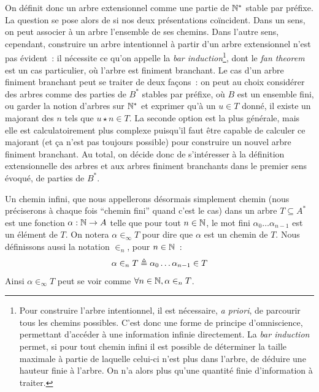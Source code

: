 \documentclass{article}
\begin{document}
On définit donc un arbre extensionnel comme une partie de $\mathbb{N}^*$ stable par préfixe. La question se pose alors de si nos deux présentations coïncident. Dans un sens, on peut associer à un arbre l'ensemble de ses chemins. Dans l'autre sens, cependant, construire un arbre intentionnel à partir d'un arbre extensionnel n'est pas évident~: il nécessite ce qu'on appelle la \textit{bar induction}\footnote{Pour construire l'arbre intentionnel, il est nécessaire, \textit{a priori}, de parcourir tous les chemins possibles. C'est donc une forme de principe d'omniscience, permettant d'accéder à une information infinie directement. La \textit{bar induction} permet, si pour tout chemin infini il est possible de déterminer la taille maximale à partie de laquelle celui-ci n'est plus dans l'arbre, de déduire une hauteur finie à l'arbre. On n'a alors plus qu'une quantité finie d'information à traiter.}, dont le \textit{fan theorem} est un cas particulier, où l'arbre est finiment branchant. Le cas d'un arbre finiment branchant peut se traiter de deux façons~: on peut au choix considérer des arbres comme des parties de $B^*$ stables par préfixe, où $B$ est un ensemble fini, ou garder la notion d'arbres sur $\mathbb{N}^*$ et exprimer qu'à un $u \in T$ donné, il existe un majorant des $n$ tels que $u \star n \in T$. La seconde option est la plus générale, mais elle est calculatoirement plus complexe puisqu'il faut être capable de calculer ce majorant (et ça n'est pas toujours possible) pour construire un nouvel arbre finiment branchant. Au total, on décide donc de s'intéresser à la définition extensionnelle des arbres et aux arbres finiment branchants dans le premier sens évoqué, de parties de $B^*$.

Un chemin infini, que nous appellerons désormais simplement chemin (nous préciserons à chaque fois ``chemin fini'' quand c'est le cas) dans un arbre $T \subseteq A^*$ est une fonction $\alpha : \mathbb{N} \to A$ telle que pour tout $n\in \mathbb{N}$, le mot fini $\alpha_0\ldots\alpha_{n-1}$ est un élément de $T$. On notera $\alpha \in_\infty T$ pour dire que $\alpha$ est un chemin de $T$. Nous définissons aussi la notation $\in_n$, pour $n \in \mathbb{N}$~:
\[\alpha \in_n T \triangleq \alpha_0\ldots\alpha_{n-1} \in T\]
Ainsi $\alpha\in_\infty T$ peut se voir comme $\forall n\in \mathbb{N}, \alpha\in_n T$.
\end{document}
